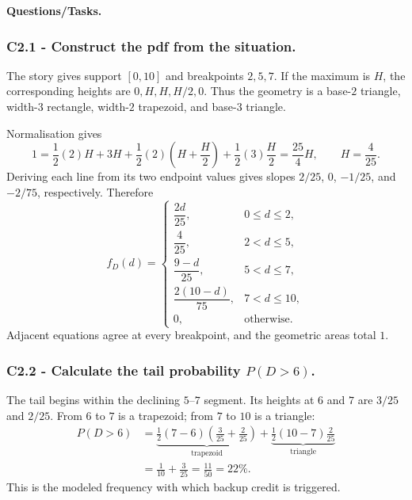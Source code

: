 \textbf{Questions/Tasks.}
\begin{enumerate}
\end{enumerate}

\subsubsection*{C2.1 - Construct the pdf from the situation.}
\label{subsec:c2-piecewise-linear-liquidity-a}
The story gives support $[0,10]$ and breakpoints $2,5,7$.  If the maximum is
$H$, the corresponding heights are $0,H,H,H/2,0$.  Thus the geometry is a
base-$2$ triangle, width-$3$ rectangle, width-$2$ trapezoid, and base-$3$
triangle.

Normalisation gives
\[
 1=\frac12(2)H+3H+\frac12(2)\left(H+\frac H2\right)
   +\frac12(3)\frac H2=\frac{25}{4}H,\qquad H=\frac4{25}.
\]
Deriving each line from its two endpoint values gives slopes $2/25$, $0$,
$-1/25$, and $-2/75$, respectively.  Therefore
\[
 f_D(d)=\begin{cases}
 \dfrac{2d}{25},&0\le d\le2,\\[1mm]
 \dfrac4{25},&2<d\le5,\\[1mm]
 \dfrac{9-d}{25},&5<d\le7,\\[1mm]
 \dfrac{2(10-d)}{75},&7<d\le10,\\[1mm]
 0,&\text{otherwise.}
 \end{cases}
\]
Adjacent equations agree at every breakpoint, and the geometric areas total
$1$.

\subsubsection*{C2.2 - Calculate the tail probability $P(D>6)$.}
\label{subsec:c2-piecewise-linear-liquidity-b}
The tail begins within the declining $5$--$7$ segment.  Its heights at $6$ and
$7$ are $3/25$ and $2/25$.  From $6$ to $7$ is a trapezoid; from $7$ to $10$
is a triangle:
\[
 \begin{aligned}
 P(D>6)
 &=\underbrace{\frac12(7-6)\left(\frac3{25}+\frac2{25}\right)}_{\text{trapezoid}}
 +\underbrace{\frac12(10-7)\frac2{25}}_{\text{triangle}}\\
 &=\frac1{10}+\frac3{25}=\frac{11}{50}=22\%.
 \end{aligned}
\]
This is the modeled frequency with which backup credit is triggered.

